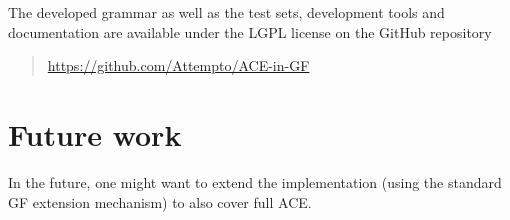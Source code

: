 \documentclass[a4paper]{article}
\begin{document}
The developed grammar as well as the test sets, development tools and
documentation are available under the LGPL license on the GitHub repository

\begin{quote}
\url{https://github.com/Attempto/ACE-in-GF}
\end{quote}

\section{Future work}

In the
future, one might want to extend the implementation (using
the standard GF extension mechanism) to also cover full ACE.



%
\end{document}
